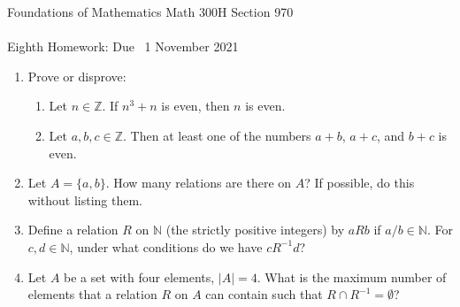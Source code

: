 \documentclass[12pt]{article}
\newcommand{\NN}{{\mathbb N}}  %
\newcommand{\ZZ}{{\mathbb Z}}  %
\begin{document}
\LARGE 
\noindent
{\color{Maroon}Foundations of Mathematics \hfill Math 300H Section 970}\vspace{2pt}\\
\Large \vspace{2pt}\\
\large
Eighth Homework: \hfill Due \  1 November 2021
\normalsize\medskip


\noindent{\color{blue}\rule{528.3675pt}{2pt}}


\begin{enumerate}  %

   
\item Prove or disprove:
  \begin{enumerate}
    \item   Let $n\in\ZZ$.  If $n^3+n$ is even, then $n$ is even.
    \item   Let $a,b,c\in\ZZ$.  Then at least one of the numbers $a+b$, $a+c$, and $b+c$ is even.
  \end{enumerate}

\item  Let $A=\{a,b\}$. How many relations are there on $A$?  If possible, do this without listing them.

\item Define a relation $R$ on $\NN$ (the strictly positive integers) by $aRb$ if $a/b\in \NN$.
  For $c,d\in\NN$, under what conditions do we have $cR^{-1} d$?

\item Let $A$ be a set with four elements, $|A|=4$.
      What is the maximum number of elements that a relation $R$ on $A$ can contain such that $R\cap R^{-1}=\emptyset$?


\end{enumerate}
\end{document}
